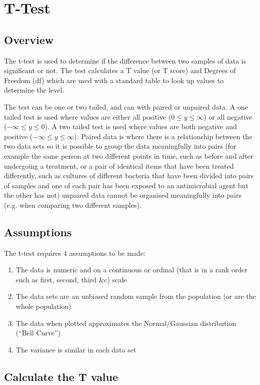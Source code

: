 \chapter{T-Test} \label{t-test}

\section{Overview}
The t-test is used to determine if the difference between two samples of data is significant or not.  The test calculates a T value (or T score) and Degrees of Freedom (df) which are used with a standard table to look up values to determine the   level.

The test can be one or two tailed, and can with paired or unpaired data.  A one tailed test is used where values are either all positive ($0 \leq y \leq \infty$) or all negative ($- \infty \leq y \leq 0$).  A two tailed test is used where values are both negative and positive ($- \infty \leq y \leq \infty$).  Paired data is where there is a relationship between the two data sets so it is possible to group the data meaningfully into pairs (for example the same person at two different points in time, such as before and after undergoing a treatment, or a pair of identical items that have been treated differently, such as cultures of different bacteria that have been divided into pairs of samples and one of each pair has been exposed to an antimicrobial agent but the other has not) unpaired data cannot be organised meaningfully into pairs (e.g. when comparing two different samples).

\section{Assumptions}
The t-test requires 4 assumptions to be made:
\begin{enumerate}
\item The data is numeric and on a continuous or ordinal (that is in a rank order such as first, second, third \&c) scale
\item The data sets are an unbiased random sample from the population (or are the whole population)
\item The data when plotted approximates the Normal/Gaussian distribution (``Bell Curve'')
\item The variance is similar in each data set
\end{enumerate}

\section{Calculate the T value}

